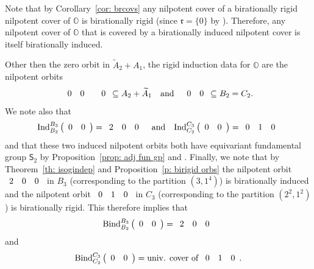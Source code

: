 \documentclass[11pt]{amsart}
\renewcommand{\O}{{\mathbb O}}
\renewcommand{\r}{{\mathfrak r}}
\newcommand{\Sym}{{\mathsf{S}}}
\newcommand{\Ind}{{{\mbox{\rm Ind}}}}
\newcommand{\BInd}{{{\mbox{\rm Bind}}}}
\numberwithin{equation}{section}
\begin{document}
	Note that by Corollary~\ref{cor: brcovs} any nilpotent cover of a birationally rigid nilpotent cover of $\O$ is birationally rigid (since $\r=\{0\}$ by \cite[\S13.1]{Car}). Therefore, any nilpotent cover of $\O$ that is covered by a birationally induced nilpotent cover is itself birationally induced.
	
	Other then the zero orbit in $\widetilde{A}_2 + A_1$, the rigid induction data for $\O$ are the nilpotent orbits $$
	\begin{array}{c c c c}
		0 & 0 &  & 0 \\
	\end{array}\subseteq A_2 + \widetilde{A}_1\quad\mbox{and}\quad \begin{array}{c c}
		0 & 0  \\
	\end{array}\subseteq B_2=C_2.
	$$ We note also that $$\Ind_{B_2}^{B_3}\left(\begin{array}{c c}
		0 & 0 \\
	\end{array}\right)= \begin{array}{c c c}
		2 & 0 & 0 \\
	\end{array}\quad \mbox{and}\quad \Ind_{C_2}^{C_3}\left(\begin{array}{c c}
		0 & 0  \\
	\end{array}\right)= \begin{array}{c c c}
		0 & 1 & 0 \\
	\end{array}$$ and that these two induced nilpotent orbits both have equivariant fundamental group $\Sym_2$ by Proposition~\ref{prop: adj fun gp} and \cite[Corollary 6.1.6]{CM}.
	Finally, we note that by Theorem~\ref{th: isogindep} and Proposition~\ref{p: birigid orbs} the nilpotent orbit $\begin{array}{c c c}
		2 & 0 & 0\\
	\end{array}$ in $B_3$ (corresponding to the partition $(3,1^4)$) is birationally induced and the nilpotent orbit $\begin{array}{c c c}
		0 & 1 & 0 \\
	\end{array}$ in $C_3$ (corresponding to the partition $(2^2,1^2)$) is birationally rigid. This therefore implies that $$\BInd_{B_2}^{B_3}\left(\begin{array}{c c}
		0 & 0 \\
	\end{array}\right)=\begin{array}{c c c}
		2 & 0 & 0  \\
	\end{array}$$ and  $$\BInd_{C_2}^{C_3}\left(\begin{array}{c c}
		0 & 0 \\
	\end{array}\right)=\mbox{univ. cover of } \begin{array}{c c c}
		0 & 1 & 0 \\
	\end{array}.$$
	
\end{document}

